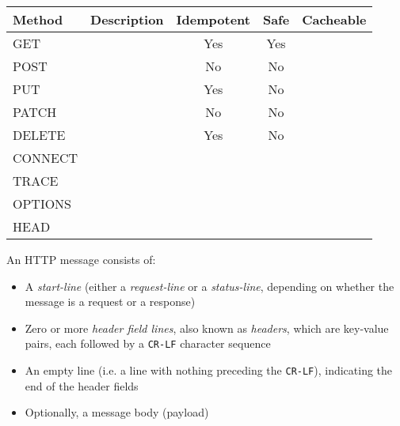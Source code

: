 \documentclass[12pt, titlepage]{article}
\begin{document}
\begin{table}
  \begin{center}
    \begin{tabular}{|l|l|c|c|l|}
      \hline
      \textbf{Method} & \textbf{Description} & \textbf{Idempotent} & \textbf{Safe} & \textbf{Cacheable} \\ \hline
      GET & & Yes & Yes & \\ \hline
      POST & & No & No & \\ \hline
      PUT & & Yes & No & \\ \hline
      PATCH & & No & No & \\ \hline
      DELETE & & Yes & No & \\ \hline
      CONNECT & & & & \\ \hline
      TRACE & & & & \\ \hline
      OPTIONS & & & & \\ \hline
      HEAD & & & & \\ \hline
    \end{tabular}
  \end{center}
\end{table}

An HTTP message consists of:
\begin{itemize}
  \item A \textit{start-line} (either a \textit{request-line} or a \textit{status-line}, depending on whether the message is a request or a response)
  \item Zero or more \textit{header field lines}, also known as \textit{headers}, which are key-value pairs, each followed by a \texttt{CR-LF} character sequence
  \item An empty line (i.e. a line with nothing preceding the \texttt{CR-LF}), indicating the end of the header fields
  \item Optionally, a message body (payload) \\
\end{itemize}
\end{document}
